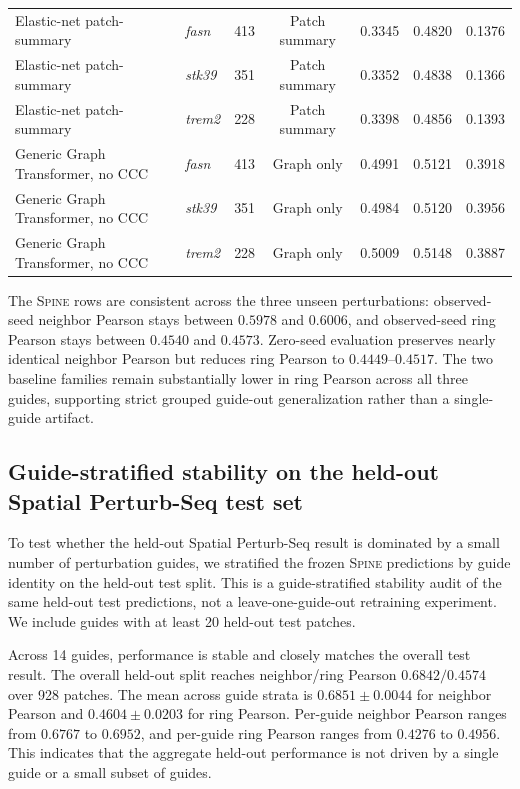 \documentclass[sigconf,anonymous,review]{acmart}
\newcommand{\methodname}{\textsc{Spine}\xspace}
\begin{document}
\begin{table}[t]
{\begin{tabular}{llrcccc}
Elastic-net patch-summary &
\textit{fasn} &
413 &
Patch summary &
0.3345 &
0.4820 &
0.1376 \\

Elastic-net patch-summary &
\textit{stk39} &
351 &
Patch summary &
0.3352 &
0.4838 &
0.1366 \\

Elastic-net patch-summary &
\textit{trem2} &
228 &
Patch summary &
0.3398 &
0.4856 &
0.1393 \\

Generic Graph Transformer, no CCC &
\textit{fasn} &
413 &
Graph only &
0.4991 &
0.5121 &
0.3918 \\

Generic Graph Transformer, no CCC &
\textit{stk39} &
351 &
Graph only &
0.4984 &
0.5120 &
0.3956 \\

Generic Graph Transformer, no CCC &
\textit{trem2} &
228 &
Graph only &
0.5009 &
0.5148 &
0.3887 \\

\bottomrule
\end{tabular}
}
\end{table}

The \methodname{} rows are consistent across the three unseen perturbations: observed-seed neighbor Pearson stays between $0.5978$ and $0.6006$, and observed-seed ring Pearson stays between $0.4540$ and $0.4573$. Zero-seed evaluation preserves nearly identical neighbor Pearson but reduces ring Pearson to $0.4449$--$0.4517$. The two baseline families remain substantially lower in ring Pearson across all three guides, supporting strict grouped guide-out generalization rather than a single-guide artifact.

\subsection{Guide-stratified stability on the held-out Spatial Perturb-Seq test set}
\label{app:guide_stratified_stability}

To test whether the held-out Spatial Perturb-Seq result is dominated by a small
number of perturbation guides, we stratified the frozen \methodname{} predictions
by guide identity on the held-out test split. This is a guide-stratified stability
audit of the same held-out test predictions, not a leave-one-guide-out retraining
experiment. We include guides with at least 20 held-out test patches.

Across 14 guides, performance is stable and closely matches the overall test result.
The overall held-out split reaches neighbor/ring Pearson $0.6842/0.4574$ over
928 patches. The mean across guide strata is $0.6851 \pm 0.0044$ for neighbor
Pearson and $0.4604 \pm 0.0203$ for ring Pearson. Per-guide neighbor Pearson ranges
from $0.6767$ to $0.6952$, and per-guide ring Pearson ranges from $0.4276$ to
$0.4956$. This indicates that the aggregate held-out performance is not driven by
a single guide or a small subset of guides.
\end{document}
